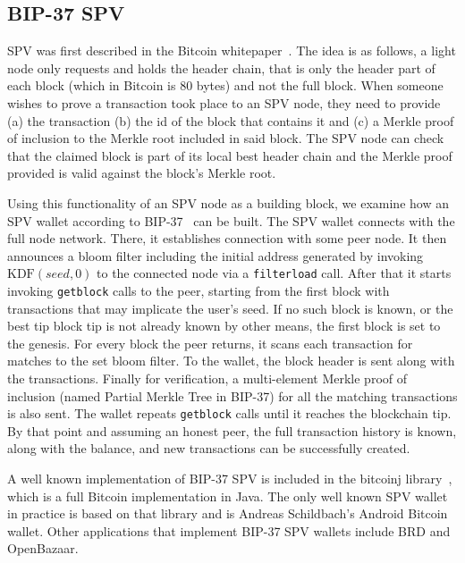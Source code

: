 \documentclass[sigconf]{acmart}
\begin{document}
\subsection{BIP-37 SPV}
SPV was first described in the Bitcoin whitepaper~\cite{bitcoin}.
The idea is as follows, a light node only requests and holds the header chain, that is only the header part of each block (which in Bitcoin is 80 bytes) and not the full block. When someone wishes to prove a transaction took place to an SPV node, they need to provide (a) the transaction (b) the id of the block that contains it and (c) a Merkle proof of inclusion to the Merkle root included in said block. The SPV node can check that the claimed block is part of its local best header chain and the Merkle proof provided is valid against the block's Merkle root.

Using this functionality of an SPV node as a building block, we examine how an SPV wallet according to BIP-37~\cite{bip37} can be built. The SPV wallet connects with the full node network. There, it establishes connection with some peer node. It then announces a bloom filter including the initial address generated by invoking $\text{KDF}(seed, 0)$ to the connected node via a \texttt{filterload} call. After that it starts invoking \texttt{getblock} calls to the peer, starting from the first block with transactions that may implicate the user's seed. If no such block is known, or the best tip block tip is not already known by other means, the first block is set to the genesis. For every block the peer returns, it scans each transaction for matches to the set bloom filter. To the wallet, the block header is sent along with the transactions. Finally for verification, a multi-element Merkle proof of inclusion (named Partial Merkle Tree in BIP-37) for all the matching transactions is also sent. The wallet repeats \texttt{getblock} calls until it reaches the blockchain tip. By that point and assuming an honest peer, the full transaction history is known, along with the balance, and new transactions can be successfully created.


A well known implementation of BIP-37 SPV is included in the bitcoinj library~\cite{bitcoinj}, which is a full Bitcoin implementation in Java. The only well known SPV wallet in practice is based on that library and is Andreas Schildbach's Android Bitcoin wallet. Other applications that implement BIP-37 SPV wallets include BRD and OpenBazaar.
\end{document}
